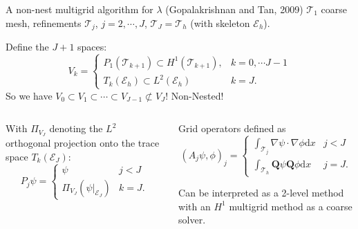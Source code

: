 \documentclass[9pt]{beamer}
\renewcommand\vec{\mathbf}
\begin{document}
\begin{frame}[c]{A non-nest multigrid algorithm for $\lambda$ (Gopalakrishnan and Tan, 2009)}
	$\mathcal{T}_1$ coarse mesh, refinements $\mathcal{T}_j$, $j=2,\cdots,J$,
	$\mathcal{T}_J = \mathcal{T}_h$ (with skeleton $\mathcal{E}_h$).
	\begin{tcolorbox}[colback=blue!5!white,colframe=mDarkTeal,title=Space hierarchy]
		Define the $J+1$ spaces:
		\begin{equation*}
			V_k = \begin{cases}
			P_1(\mathcal{T}_{k+1}) \subset H^1(\mathcal{T}_{k+1}), &
			k = 0,\cdots J-1 \\
			T_k(\mathcal{E}_h) \subset L^2(\mathcal{E}_h) & k=J.
			\end{cases}
		\end{equation*}
		So we have $V_0 \subset V_1 \subset \cdots \subset V_{J-1} \not\subset V_J$! Non-Nested!
\end{tcolorbox}
\begin{columns}
	\begin{column}{0.5\textwidth}
		\begin{tcolorbox}[colback=blue!5!white,colframe=mDarkTeal, title=Prologation]
		With $\Pi_{V_J}$ denoting the $L^2$ orthogonal projection 
		onto the trace space $T_k(\mathcal{E}_J)$:
		\begin{equation*}
			P_j\psi = \begin{cases}
			\psi & j < J \\
			\Pi_{V_J}\left(\psi|_{\mathcal{E}_J}\right) & k = J.
			\end{cases}
		\end{equation*}
		\end{tcolorbox}
	\end{column}
	\begin{column}{0.5\textwidth}
		Grid operators defined as
		\begin{equation*}
			(A_j\psi, \phi)_j = \begin{cases}
			\int_{\mathcal{T}_j} \nabla\psi \cdot \nabla\phi\mathrm{d}x
			& j < J \\
			\int_{\mathcal{T}_h}\vec{Q}\psi\vec{Q}\phi\mathrm{d}x
			& j=J.
			\end{cases}
		\end{equation*}
	\begin{tcolorbox}[width=\linewidth,
		left=0pt,
		right=0pt,
		top=2pt,
		]%
		Can be interpreted as a 2-level method with an
		$H^1$ multigrid method
		as a coarse solver.
	\end{tcolorbox}
	\end{column}
\end{columns}
\end{frame}
\end{document}
